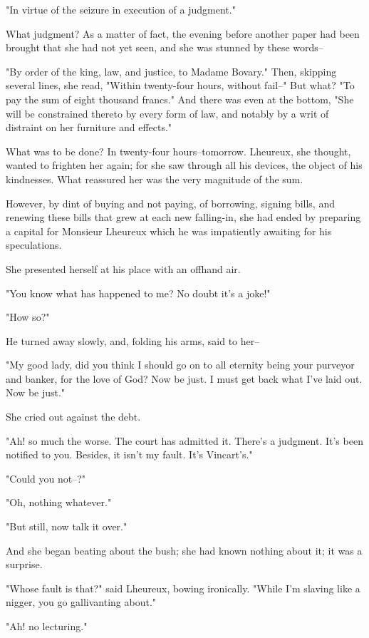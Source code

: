 \documentclass[11pt,twocolumn]{ltugboat}
\begin{document}
"In virtue of the seizure in execution of a judgment."

What judgment? As a matter of fact, the evening before another paper
had been brought that she had not yet seen, and she was stunned by these
words--

"By order of the king, law, and justice, to Madame Bovary." Then,
skipping several lines, she read, "Within twenty-four hours, without
fail--" But what? "To pay the sum of eight thousand francs." And there
was even at the bottom, "She will be constrained thereto by every
form of law, and notably by a writ of distraint on her furniture and
effects."

What was to be done? In twenty-four hours--tomorrow. Lheureux, she
thought, wanted to frighten her again; for she saw through all his
devices, the object of his kindnesses. What reassured her was the very
magnitude of the sum.

However, by dint of buying and not paying, of borrowing, signing bills,
and renewing these bills that grew at each new falling-in, she had ended
by preparing a capital for Monsieur Lheureux which he was impatiently
awaiting for his speculations.

She presented herself at his place with an offhand air.

"You know what has happened to me? No doubt it's a joke!"

"How so?"

He turned away slowly, and, folding his arms, said to her--

"My good lady, did you think I should go on to all eternity being your
purveyor and banker, for the love of God? Now be just. I must get back
what I've laid out. Now be just."

She cried out against the debt.

"Ah! so much the worse. The court has admitted it. There's a judgment.
It's been notified to you. Besides, it isn't my fault. It's Vincart's."

"Could you not--?"

"Oh, nothing whatever."

"But still, now talk it over."

And she began beating about the bush; she had known nothing about it; it
was a surprise.

"Whose fault is that?" said Lheureux, bowing ironically. "While I'm
slaving like a nigger, you go gallivanting about."

"Ah! no lecturing."
\end{document}
